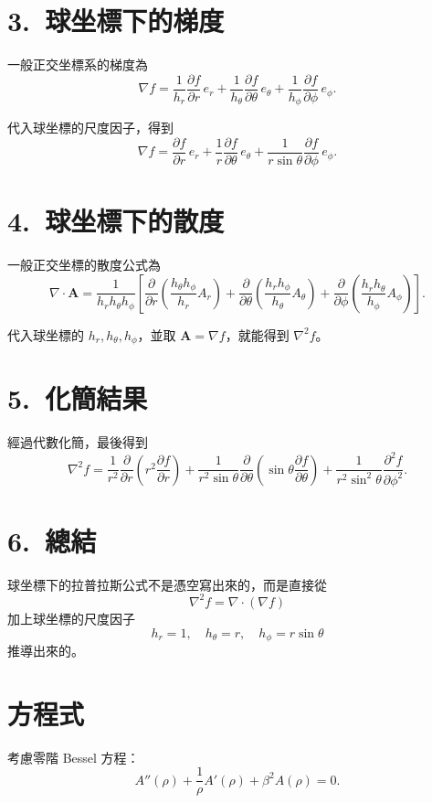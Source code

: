 \documentclass{article}
\def\hat#1{#1}%
\begin{document}
\section*{3.~球坐標下的梯度}
一般正交坐標系的梯度為
\[
\nabla f =
\frac{1}{h_r}\frac{\partial f}{\partial r}\,\hat{e}_r
+ \frac{1}{h_\theta}\frac{\partial f}{\partial \theta}\,\hat{e}_\theta
+ \frac{1}{h_\phi}\frac{\partial f}{\partial \phi}\,\hat{e}_\phi.
\]

代入球坐標的尺度因子，得到
\[
\nabla f =
\frac{\partial f}{\partial r}\,\hat{e}_r
+ \frac{1}{r}\frac{\partial f}{\partial \theta}\,\hat{e}_\theta
+ \frac{1}{r\sin\theta}\frac{\partial f}{\partial \phi}\,\hat{e}_\phi.
\]

\section*{4.~球坐標下的散度}
一般正交坐標的散度公式為
\[
\nabla \cdot \mathbf{A}
= \frac{1}{h_r h_\theta h_\phi}
\left[
\frac{\partial}{\partial r}\!\left(\frac{h_\theta h_\phi}{h_r} A_r\right)
+ \frac{\partial}{\partial \theta}\!\left(\frac{h_r h_\phi}{h_\theta} A_\theta\right)
+ \frac{\partial}{\partial \phi}\!\left(\frac{h_r h_\theta}{h_\phi} A_\phi\right)
\right].
\]

代入球坐標的 $h_r,h_\theta,h_\phi$，並取 $\mathbf{A}=\nabla f$，就能得到 $\nabla^2 f$。

\section*{5.~化簡結果}
經過代數化簡，最後得到
\[
\nabla^2 f =
\frac{1}{r^2}\frac{\partial}{\partial r}\!\left(r^2 \frac{\partial f}{\partial r}\right)
+ \frac{1}{r^2 \sin\theta}\frac{\partial}{\partial \theta}\!\left(\sin\theta \frac{\partial f}{\partial \theta}\right)
+ \frac{1}{r^2 \sin^2\theta}\frac{\partial^2 f}{\partial \phi^2}.
\]

\section*{6.~總結}
球坐標下的拉普拉斯公式不是憑空寫出來的，而是直接從
\[
\nabla^2 f = \nabla \cdot (\nabla f)
\]
加上球坐標的尺度因子
\[
h_r=1,\quad h_\theta=r,\quad h_\phi=r\sin\theta
\]
推導出來的。

\section*{方程式}
考慮零階 Bessel 方程：
\[
A''(\rho)+\frac{1}{\rho}A'(\rho)+\beta^2 A(\rho)=0.
\]
\end{document}
